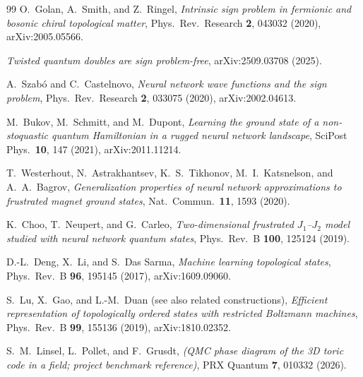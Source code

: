 \documentclass[11pt]{article}
\begin{document}
\begin{thebibliography}{99}
O.~Golan, A.~Smith, and Z.~Ringel,
\emph{Intrinsic sign problem in fermionic and bosonic chiral topological
matter}, Phys.\ Rev.\ Research \textbf{2}, 043032 (2020), arXiv:2005.05566.

\emph{Twisted quantum doubles are sign problem-free}, arXiv:2509.03708 (2025).

A.~Szab\'o and C.~Castelnovo,
\emph{Neural network wave functions and the sign problem},
Phys.\ Rev.\ Research \textbf{2}, 033075 (2020), arXiv:2002.04613.

M.~Bukov, M.~Schmitt, and M.~Dupont,
\emph{Learning the ground state of a non-stoquastic quantum Hamiltonian in a
rugged neural network landscape},
SciPost Phys.\ \textbf{10}, 147 (2021), arXiv:2011.11214.

T.~Westerhout, N.~Astrakhantsev, K.~S.~Tikhonov, M.~I.~Katsnelson, and
A.~A.~Bagrov,
\emph{Generalization properties of neural network approximations to frustrated
magnet ground states}, Nat.\ Commun.\ \textbf{11}, 1593 (2020).

K.~Choo, T.~Neupert, and G.~Carleo,
\emph{Two-dimensional frustrated $J_1$--$J_2$ model studied with neural
network quantum states}, Phys.\ Rev.\ B \textbf{100}, 125124 (2019).

D.-L.~Deng, X.~Li, and S.~Das Sarma,
\emph{Machine learning topological states},
Phys.\ Rev.\ B \textbf{96}, 195145 (2017), arXiv:1609.09060.

S.~Lu, X.~Gao, and L.-M.~Duan (see also related constructions),
\emph{Efficient representation of topologically ordered states with restricted
Boltzmann machines}, Phys.\ Rev.\ B \textbf{99}, 155136 (2019),
arXiv:1810.02352.

S.~M.~Linsel, L.~Pollet, and F.~Grusdt,
\emph{(QMC phase diagram of the 3D toric code in a field; project benchmark
reference)}, PRX Quantum \textbf{7}, 010332 (2026).

\end{thebibliography}
\end{document}
